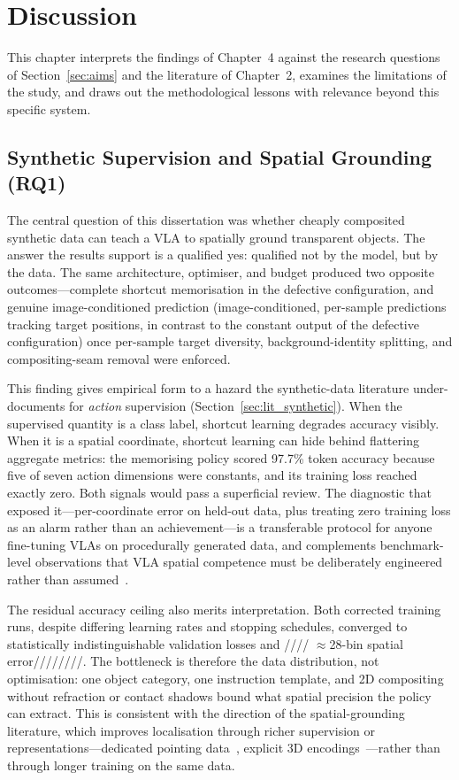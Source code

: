 \chapter{Discussion}
\label{ch:discussion}

This chapter interprets the findings of Chapter~4 against the research questions of Section~\ref{sec:aims} and the literature of Chapter~2, examines the limitations of the study, and draws out the methodological lessons with relevance beyond this specific system.

\section{Synthetic Supervision and Spatial Grounding (RQ1)}
\label{sec:disc_rq1}

The central question of this dissertation was whether cheaply composited synthetic data can teach a VLA to spatially ground transparent objects. The answer the results support is a qualified yes: qualified not by the model, but by the data. The same architecture, optimiser, and budget produced two opposite outcomes---complete shortcut memorisation in the defective configuration, and genuine image-conditioned prediction (image-conditioned, per-sample predictions tracking target positions, in contrast to the constant output of the defective configuration) once per-sample target diversity, background-identity splitting, and compositing-seam removal were enforced.

This finding gives empirical form to a hazard the synthetic-data literature under-documents for \emph{action} supervision (Section~\ref{sec:lit_synthetic}). When the supervised quantity is a class label, shortcut learning degrades accuracy visibly. When it is a spatial coordinate, shortcut learning can hide behind flattering aggregate metrics: the memorising policy scored 97.7\% token accuracy because five of seven action dimensions were constants, and its training loss reached exactly zero. Both signals would pass a superficial review. The diagnostic that exposed it---per-coordinate error on held-out data, plus treating zero training loss as an alarm rather than an achievement---is a transferable protocol for anyone fine-tuning VLAs on procedurally generated data, and complements benchmark-level observations that VLA spatial competence must be deliberately engineered rather than assumed~\citep{cai2024, yuan2024}.

The residual accuracy ceiling also merits interpretation. Both corrected training runs, despite differing learning rates and stopping schedules, converged to statistically indistinguishable validation losses and //// $\approx$28-bin spatial error////////. The bottleneck is therefore the data distribution, not optimisation: one object category, one instruction template, and 2D compositing without refraction or contact shadows bound what spatial precision the policy can extract. This is consistent with the direction of the spatial-grounding literature, which improves localisation through richer supervision or representations---dedicated pointing data~\citep{yuan2024}, explicit 3D encodings~\citep{qu2025, zhen2024}---rather than through longer training on the same data.

